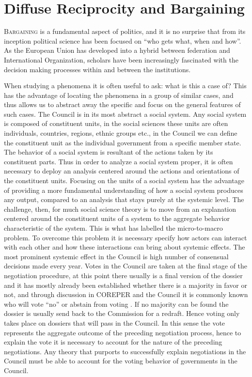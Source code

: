 \chapter{Diffuse Reciprocity and Bargaining}
\label{chapter:theory}

\lettrine[lines = 3]{B}{argaining} is a fundamental aspect of politics, and it is no surprise that from its inception political science has been focused on ``who gets what, when and how''.  As the European Union has developed into a hybrid between federation and International Organization, scholars have been increasingly fascinated with the decision making processes within and between the institutions. 

When studying a phenomena it is often useful to ask: what is this a case of? This has the advantage of locating the phenomena in a group of similar cases, and thus allows us to abstract away the specific and focus on the general features of such cases. The Council is in its most abstract a social system. Any social system is composed of constituent units, in the social sciences these units are often individuals, countries, regions, ethnic groups etc., in the Council we can define the constituent unit as the individual government from a specific member state. The behavior of a social system is resultant of the actions taken by its constituent parts. Thus in order to analyze a social system proper, it is often necessary to deploy an analysis centered around the actions and orientations of the constituent units. Focusing on the units of a social system has the advantage of providing a more fundamental understanding of how a social system produces any output, compared to an analysis that stays purely at the systemic level. The challenge, then, for much social science theory is to move from an explanation centered around the constituent units of a system to the aggregate behavior characteristic of the system. This is what \citet{Coleman1990} has labelled the micro-to-macro problem. To overcome this problem it is necessary specify how actors can interact with each other and how these interactions can bring about systemic effects. The most prominent systemic effect in the Council is high number of consensual decisions made every year. Votes in the Council are taken at the final stage of the negotiation procedure, at this point there usually is a final version of the dossier and it has mostly already been established whether there is a majority in favor or not, and through discussion in COREPER and the Council it is commonly known who will vote ``no'' or abstain from voting \citep{Lempp2008}. If no majority can be found the dossier is usually send back  to the Commission for a redraft. Hence voting only takes place on dossiers that will pass in the Council. In this sense the vote represents the aggregate outcome of the preceding negotiation process, hence to explain the vote it is necessary to account for the nature of the preceding negotiations. Any theory that purports to successfully explain negotiations in the Council must be able to account for the voting behavior of governments in the Council.

